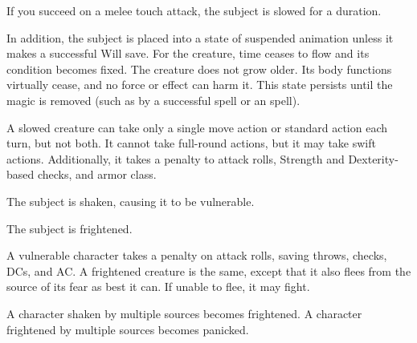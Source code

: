 \begin{spelleffect}
  If you succeed on a melee touch attack, the subject is slowed for a \durshort duration.
\end{spelleffect}
\begin{spellblood}
  In addition, the subject is placed into a state of suspended animation unless it makes a successful Will save. For the creature, time ceases to flow and its condition becomes fixed. The creature does not grow older. Its body functions virtually cease, and no force or effect can harm it. This state persists until the magic is removed (such as by a successful  spell or an  spell).
\end{spellblood}
\begin{spellnotes}
    A slowed creature can take only a single move action or standard action each turn, but not both. It cannot take full-round actions, but it may take swift actions. Additionally, it takes a  penalty to attack rolls, Strength and Dexterity-based checks, and armor class.
\end{spellnotes}

\spellrng{\rngclose}
\spelldur{\durshort}
\begin{spellhealthy}
  The subject is shaken, causing it to be vulnerable.
\end{spellhealthy}
\begin{spellblood}
  The subject is frightened.
\end{spellblood}
\begin{spellnotes}
  A vulnerable character takes a  penalty on attack rolls, saving throws, checks, DCs, and AC. A frightened creature is the same, except that it also flees from the source of its fear as best it can. If unable to flee, it may fight.
  \par A character shaken by multiple sources becomes frightened. A character frightened by multiple sources becomes panicked.
\end{spellnotes}

